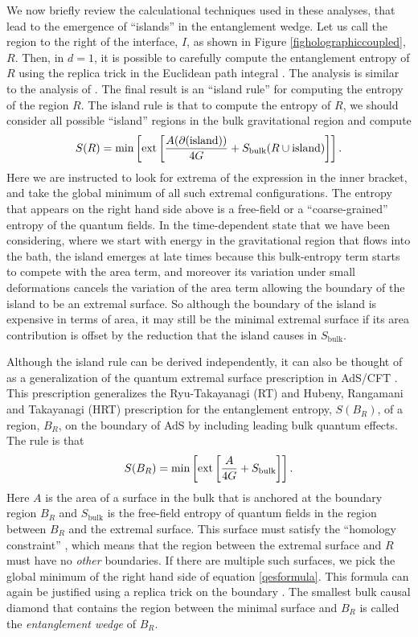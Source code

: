 \documentclass[12pt]{article}
\def\gnewt{G}
\newcommand{\be}{\begin{equation}}
\newcommand{\ee}{\end{equation}}
\begin{document}
We now briefly review the calculational techniques used in these analyses, that lead to the emergence of ``islands'' in the entanglement wedge.
Let us call the region to the right of the interface, $I$, as shown in Figure \ref{figholographiccoupled}, $R$.  Then, in $d = 1$, it is possible to carefully compute the entanglement entropy of $R$ using the replica trick in the Euclidean path integral \cite{Almheiri:2019qdq,Penington:2019kki}. The analysis is similar to the analysis of \cite{Lewkowycz:2013nqa}. The final result is an ``island rule'' for computing the entropy of the region $R$. The island
rule is that to compute the entropy of $R$, we should consider all possible ``island'' regions in the bulk gravitational region and compute
\be
\label{islandformula}
S(R) = \text{min}\left[ \text{ext} \left[{A(\partial(\text{island})) \over 4 \gnewt} + S_{\text{bulk}}(R \cup \text{island}) \right]\right].
\ee
Here we are instructed to look for extrema of the expression in the inner bracket, and take the global minimum of all such extremal configurations.
The entropy that appears on the right hand side above  is a free-field or a ``coarse-grained'' entropy of the quantum fields. In the time-dependent state that we have been considering, where we start with energy in the
gravitational region that flows into the bath,  the island emerges at late times because this bulk-entropy term  starts to compete with the area term, and moreover its variation under small deformations cancels the variation of the area term allowing the boundary of the island to be an extremal surface. So although the boundary of the island is expensive in terms of area, it may still be the minimal extremal surface  if its area contribution is offset by the reduction
that the island causes in $S_{\text{bulk}}$.

Although the island rule can be derived independently, it can also be thought of as a generalization of the quantum extremal surface prescription in AdS/CFT \cite{Engelhardt:2014gca}. This prescription generalizes the Ryu-Takayanagi (RT)  \cite{Ryu:2006bv,Ryu:2006ef} and  Hubeny, Rangamani and Takayanagi  (HRT) \cite{Hubeny:2007xt} prescription for the entanglement entropy, $S(B_R)$, of a region, $B_R$, on the boundary of AdS  by including leading bulk quantum effects. The rule is that
\be
\label{qesformula}
S(B_R) = \text{min}\left[ \text{ext} \left[{A \over 4 \gnewt} + S_{\text{bulk}} \right]\right].
\ee
Here $A$ is the area of a surface in the bulk that is anchored at the boundary region $B_R$ and $S_{\text{bulk}}$ is the free-field entropy of quantum fields in the region between $B_R$ and the extremal surface. This surface must satisfy the ``homology constraint'' \cite{Headrick:2014cta,Headrick:2013zda}, which means that the region between the extremal surface and $R$ must have no {\em other} boundaries.   If there are multiple such surfaces, we pick the global minimum of the right hand side of equation \eqref{qesformula}. This formula can again be justified using a replica trick on the boundary \cite{Faulkner:2013ana}. The smallest bulk causal diamond that contains the region between the minimal surface and $B_R$ is called the {\em entanglement wedge} of $B_R$.
\end{document}
